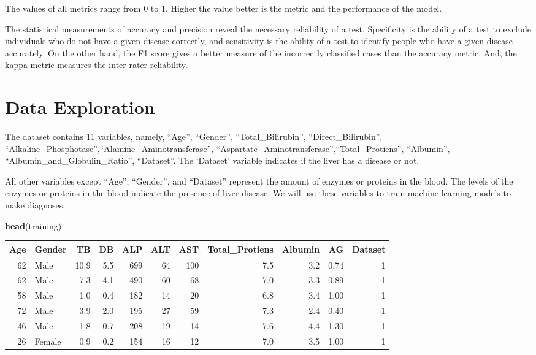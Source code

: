 \documentclass[]{article}
\newenvironment{Shaded}{\begin{snugshade}}{\end{snugshade}}
\newcommand{\KeywordTok}[1]{\textcolor[rgb]{0.13,0.29,0.53}{\textbf{#1}}}
\newcommand{\NormalTok}[1]{#1}
\begin{document}
The values of all metrics range from 0 to 1. Higher the value better is
the metric and the performance of the model.

The statistical measurements of accuracy and precision reveal the
necessary reliability of a test. Specificity is the ability of a test to
exclude individuals who do not have a given disease correctly, and
sensitivity is the ability of a test to identify people who have a given
disease accurately. On the other hand, the F1 score gives a better measure of the incorrectly
classified cases than the accuracy metric. And, the kappa metric
measures the inter-rater reliability.

\section{Data Exploration}
\label{sec:exploration}

The dataset contains 11 variables, namely, ``Age'', ``Gender'',
``Total\_Bilirubin'', ``Direct\_Bilirubin'',
``Alkaline\_Phosphotase'',``Alamine\_Aminotransferase'',
``Aspartate\_Aminotransferase'',``Total\_Protiens'', ``Albumin'',
``Albumin\_and\_Globulin\_Ratio'', ``Dataset''. The `Dataset' variable
indicates if the liver has a disease or not. 

All other variables except ``Age'', ``Gender'', and ``Dataset''
represent the amount of enzymes or proteins in the blood. The levels of
the enzymes or proteins in the blood indicate the presence of liver
disease. We will use these variables to train machine learning
models to make diagnoses.

\begin{Shaded}
\begin{Highlighting}[]
\KeywordTok{head}\NormalTok{(training)}
\end{Highlighting}
\end{Shaded}

\setlength\LTleft{0pt}
\setlength\LTright{0pt}
\begin{longtable}[]{@{}rlrrrrrrrrr@{}}
\toprule
Age & Gender & TB & DB &
ALP & ALT &
AST & Total\_Protiens & Albumin &
AG & Dataset\tabularnewline
\midrule
\endhead
62 & Male & 10.9 & 5.5 & 699 & 64 & 100 & 7.5 & 3.2 & 0.74 &
1\tabularnewline
62 & Male & 7.3 & 4.1 & 490 & 60 & 68 & 7.0 & 3.3 & 0.89 &
1\tabularnewline
58 & Male & 1.0 & 0.4 & 182 & 14 & 20 & 6.8 & 3.4 & 1.00 &
1\tabularnewline
72 & Male & 3.9 & 2.0 & 195 & 27 & 59 & 7.3 & 2.4 & 0.40 &
1\tabularnewline
46 & Male & 1.8 & 0.7 & 208 & 19 & 14 & 7.6 & 4.4 & 1.30 &
1\tabularnewline
26 & Female & 0.9 & 0.2 & 154 & 16 & 12 & 7.0 & 3.5 & 1.00 &
1\tabularnewline
\bottomrule
\end{longtable}
\end{document}
